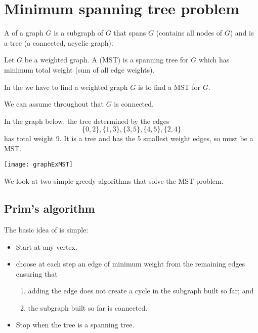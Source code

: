 \chapter{Minimum spanning tree problem} %
\label{sec:MST}
\begin{Definition}
A  of a graph $G$ is a subgraph of $G$ that spans $G$ (contains all nodes of $G$) and is a tree (a connected, acyclic graph).

Let $G$ be a weighted graph. 
A  (MST) is a spanning tree for $G$ which has minimum total weight 
(sum of all edge weights). 

In the  we have to find a weighted graph $G$ is to find a MST for $G$. 
\end{Definition}
We can assume throughout that $G$ is connected.


\begin{Boxample}
In the graph below, the tree determined by the edges
$$\{0, 2\}, \{1, 3\}, \{3, 5\}, \{4, 5\}, \{2, 4\}$$ 
has total weight $9$. 
It is a tree and has the $5$ smallest weight edges, so must be a MST.
\begin{center}
  \texttt{[image: graphExMST]}
\end{center}
\end{Boxample}

We look at two simple greedy algorithms that solve the MST problem.

\section{Prim's algorithm}
The basic idea of  is simple:
\begin{itemize}
\item Start at any vertex.
\item choose at each step an edge of minimum weight from the remaining edges ensuring that
\begin{enumerate}
\item adding the edge does not create a cycle in the subgraph built so
far; and 
\item the subgraph built so far is connected.
\end{enumerate}
\item Stop when the tree is a spanning tree.
\end{itemize}

